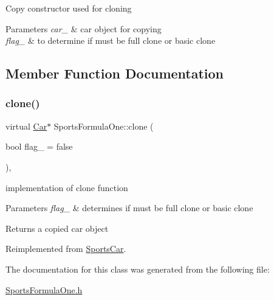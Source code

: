 Copy constructor used for cloning 
\begin{DoxyParams}{Parameters}
{\em car\+\_\+} & car object for copying \\
\hline
{\em flag\+\_\+} & to determine if must be full clone or basic clone \\
\hline
\end{DoxyParams}


\subsection{Member Function Documentation}
\mbox{\label{class_sports_formula_one_aba368f668094ef50d94c29acd739fcbe}} 
\subsubsection{\texorpdfstring{clone()}{clone()}}
{\footnotesize\ttfamily virtual \mbox{\hyperlink{class_car}{Car}}$\ast$ Sports\+Formula\+One\+::clone (\begin{DoxyParamCaption}\item[{bool}]{flag\+\_\+ = {\ttfamily false} }\end{DoxyParamCaption})\hspace{0.3cm}{\ttfamily [inline]}, {\ttfamily [virtual]}}

implementation of clone function 
\begin{DoxyParams}{Parameters}
{\em flag\+\_\+} & determines if must be full clone or basic clone \\
\hline
\end{DoxyParams}
\begin{DoxyReturn}{Returns}
a copied car object 
\end{DoxyReturn}


Reimplemented from \mbox{\hyperlink{class_sports_car_a4daa739baaee9d9d5ad33f4766ec43ec}{Sports\+Car}}.



The documentation for this class was generated from the following file\+:\begin{DoxyCompactItemize}
\item 
\mbox{\hyperlink{_sports_formula_one_8h}{Sports\+Formula\+One.\+h}}\end{DoxyCompactItemize}
